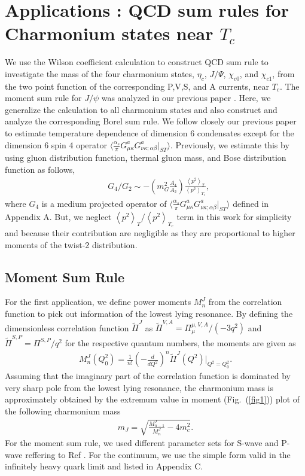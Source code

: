 \documentclass[aps,prc,superscriptaddress,showpacs,floatfix, nofootinbib,preprintnumbers,twocolumn]{revtex4}
\begin{document}
\section{Applications : QCD sum rules for Charmonium states near $T_c$}
We use the Wilson coefficient calculation to construct QCD sum rule to investigate the mass of the four charmonium states, $\eta_c$, $J/\Psi$, $\chi_{c0}$, and $\chi_{c1}$, from the two point function of the corresponding P,V,S, and A currents, near $T_c$. 
The moment sum rule for $J/\psi$ was analyzed in our previous paper \cite{Kim:2015xna}.  Here, we generalize the calculation to all charmonium states and also construct and analyze the corresponding Borel sum rule.  
We follow closely our previous paper \cite{Kim:2015xna} to estimate temperature dependence of dimension 6 condensates except for the dimension 6 spin 4 operator $\langle \frac{\alpha_s}{\pi}G^a_{\mu\kappa} G^a_{\nu\kappa;\alpha\beta}|_{ST} \rangle$.  Previously, we estimate this by using gluon distribution function, thermal gluon mass, and Bose distribution function as follows,
\begin{align}
&{G_4}/{G_2} \sim -\left(m_G^2\frac{A_4}{A_2}\right)\frac{{\left\langle p^2\right\rangle}_T}{{\left\langle p^2\right\rangle}_{T_c}},
\end{align}
where $G_4$ is a medium projected operator of $\langle \frac{\alpha_s}{\pi}G^a_{\mu\kappa} G^a_{\nu\kappa;\alpha\beta}|_{ST} \rangle$ defined in Appendix A. But, we neglect ${\left\langle p^2\right\rangle}_T / {\left\langle p^2\right\rangle}_{T_c}$ term in this work  for simplicity and because their contribution are negligible as they are proportional to higher moments of the twist-2 distribution.

\subsection{Moment Sum Rule}
For the first application, we define power moments $M^J_n$ from the correlation function to pick out information of the lowest lying resonance.  By defining the dimensionless correlation function  $\tilde{\Pi}^J$ as  $\tilde{\Pi}^{V,A}={\Pi_{\mu}^{\mu,V,A}}/{(-3q^2)}$ and $\tilde{\Pi}^{S,P}={\Pi^{S,P}}/{q^2}$ for the respective quantum numbers, the moments are given as
\begin{eqnarray}
M^J_n(Q_0^2) =\frac{1}{n!} {\left(-\frac{d}{dQ^2}\right)}^n \tilde{\Pi}^J(Q^2)|_{Q^2=Q_0^2}.
\end{eqnarray}
Assuming that the imaginary part of the correlation function is dominated by very sharp pole from the lowest lying resonance, the charmonium mass is approximately obtained by the extremum value in moment (Fig.~(\ref{fig1})) plot of the following charmonium mass 
\begin{eqnarray}
m_J= \sqrt{\frac{M^J_{n-1}}{M^J_n} -4m_c^2} .
\label{moment}
\end{eqnarray}
For the moment sum rule, we used different parameter sets for S-wave and P-wave reffering to Ref \cite{Reinders:1984sr}. For the continuum, we use the simple form valid in the infinitely heavy quark limit and listed in Appendix C.
\end{document}
